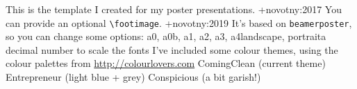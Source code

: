 \markdownRendererInterblockSeparator
{}\markdownRendererUlBegin
\markdownRendererUlItem This is the template I created for my poster presentations. +{}{}{novotny:2017}\markdownRendererUlItemEnd 
\markdownRendererUlItem You can provide an optional \texttt{\textbackslash footimage}. +{}{}{novotny:2019}\markdownRendererUlItemEnd 
\markdownRendererUlEnd \markdownRendererInterblockSeparator
{}\markdownRendererHorizontalRule{}\markdownRendererInterblockSeparator
{}\markdownRendererInterblockSeparator
{}\markdownRendererUlBegin
\markdownRendererUlItem It's based on \texttt{beamerposter}, so you can change some options:\markdownRendererInterblockSeparator
{}\markdownRendererDlBegin
{}\markdownRendererDlDefinitionBegin a0, a0b, a1, a2, a3, a4\markdownRendererDlDefinitionEnd \markdownRendererDlItemEnd {}\markdownRendererDlDefinitionBegin landscape, portrait\markdownRendererDlDefinitionEnd \markdownRendererDlItemEnd {}\markdownRendererDlDefinitionBegin a decimal number to scale the fonts\markdownRendererDlDefinitionEnd \markdownRendererDlItemEnd 
\markdownRendererDlEnd\markdownRendererUlItemEnd 
\markdownRendererUlEnd \markdownRendererInterblockSeparator
{}\markdownRendererHorizontalRule{}\markdownRendererInterblockSeparator
{}\markdownRendererInterblockSeparator
{}\markdownRendererUlBegin
\markdownRendererUlItem I've included some colour themes, using the colour palettes from \url{http://colourlovers.com}\markdownRendererInterblockSeparator
{}\markdownRendererUlBegin
\markdownRendererUlItem ComingClean (current theme)\markdownRendererUlItemEnd 
\markdownRendererUlItem Entrepreneur (light blue + grey)\markdownRendererUlItemEnd 
\markdownRendererUlItem Conspicious (a bit garish!)\markdownRendererUlItemEnd 
\markdownRendererUlEnd \markdownRendererUlItemEnd 
\markdownRendererUlEnd \markdownRendererInterblockSeparator
{}\markdownRendererHorizontalRule{}\markdownRendererInterblockSeparator
{}\markdownRendererInterblockSeparator
{}\markdownRendererInterblockSeparator
{}\markdownRendererInterblockSeparator
{}\markdownRendererHorizontalRule{}\relax